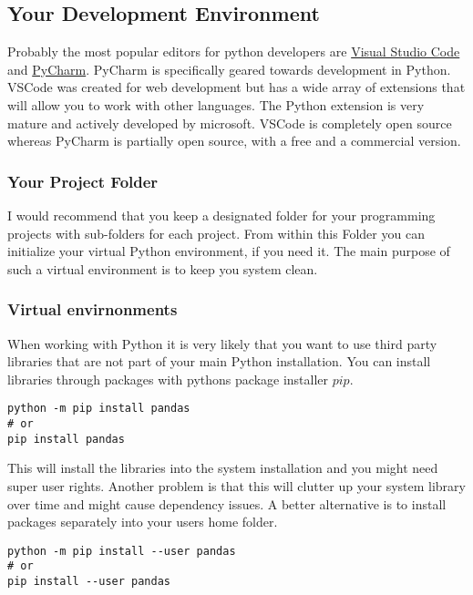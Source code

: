 \documentclass{article}
\begin{document}
\subsection{Your Development Environment}

Probably the most popular editors for python developers are
\href{https://code.visualstudio.com/}{Visual Studio Code}
and \href{https://www.jetbrains.com/pycharm/}{PyCharm}.
PyCharm is specifically geared towards development in Python.
VSCode was created for web development but has a wide array of
extensions that will allow you to work with other languages.
The Python extension is very mature and actively developed by microsoft.
VSCode is completely open source whereas PyCharm is partially open source, with
a free and a commercial version.

\subsubsection{Your Project Folder}

I would recommend that you keep a designated folder for your programming projects with sub-folders for each project.
From within this Folder you can initialize your virtual Python environment, if you need it.
The main purpose of such a virtual environment is to keep you system clean.

\subsubsection{Virtual envirnonments}

When working with Python it is very likely that you want to use third party libraries
that are not part of your main Python installation.
You can install libraries through packages with pythons package installer $pip$.

\begin{lstlisting}
python -m pip install pandas
# or
pip install pandas
\end{lstlisting}

This will install the libraries into the system installation and you might need super user rights.
Another problem is that this will clutter up your system library over time and might cause
dependency issues.
A better alternative is to install packages separately into your users home folder.

\begin{lstlisting}
python -m pip install --user pandas
# or
pip install --user pandas
\end{lstlisting}
\end{document}
